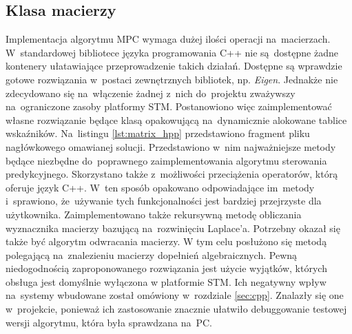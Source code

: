 \subsection{Klasa macierzy} \label{sec:matrices}
Implementacja algorytmu MPC wymaga dużej ilości operacji na~macierzach. W~standardowej bibliotece języka
programowania C++ nie są~dostępne żadne kontenery ułatawiające przeprowadzenie takich działań. Dostępne
są wprawdzie gotowe rozwiązania w~postaci zewnętrznych bibliotek, np. \textit{Eigen}. Jednakże nie
zdecydowano się na~włączenie żadnej z~nich do~projektu zważywszy na~ograniczone zasoby platformy STM.
Postanowiono więc zaimplementować własne rozwiązanie będące klasą opakowującą na~dynamicznie alokowane
tablice wskaźników. Na~listingu \ref{lst:matrix_hpp} przedstawiono fragment pliku nagłówkowego omawianej
solucji. Przedstawiono w~nim najważniejsze metody będące niezbędne do~poprawnego zaimplementowania 
algorytmu sterowania predykcyjnego. Skorzystano także z~możliwości przeciążenia operatorów, którą oferuje
język C++. W~ten sposób opakowano odpowiadające im~metody i~sprawiono, że~używanie tych funkcjonalności
jest bardziej przejrzyste dla użytkownika. Zaimplementowano także rekursywną metodę obliczania wyznacznika
macierzy bazującą na~rozwinięciu Laplace'a. Potrzebny okazał się także być algorytm odwracania macierzy.
W tym celu posłużono się metodą polegającą na~znalezieniu macierzy dopełnień algebraicznych. Pewną
niedogodnością zaproponowanego rozwiązania jest użycie wyjątków, których obsługa jest domyślnie wyłączona
w platformie STM. Ich negatywny wpływ na~systemy wbudowane został omówiony w~rozdziale \ref{sec:cpp}.
Znalazły się one w~projekcie, ponieważ ich zastosowanie znacznie ułatwiło debuggowanie testowej wersji
algorytmu, która była sprawdzana na~PC.  

